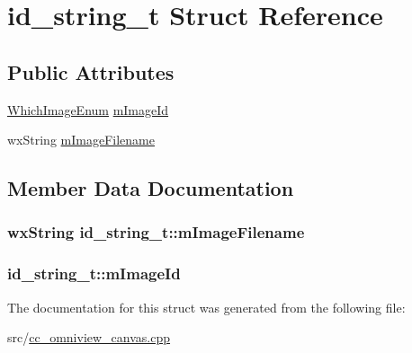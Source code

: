 \hypertarget{a00109}{\section{id\-\_\-string\-\_\-t Struct Reference}
\label{a00109}
}
\subsection*{Public Attributes}
\begin{DoxyCompactItemize}
\item 
\hyperlink{a00184_a7eb3720b4254c41f480c577182480c7b}{Which\-Image\-Enum} \hyperlink{a00109_a4f125fa4759bb32f510b4ac994c6ab51}{m\-Image\-Id}
\item 
wx\-String \hyperlink{a00109_a0eb71b151a5c13986c44b8eb81eb34db}{m\-Image\-Filename}
\end{DoxyCompactItemize}


\subsection{Member Data Documentation}
\hypertarget{a00109_a0eb71b151a5c13986c44b8eb81eb34db}{
\subsubsection[{m\-Image\-Filename}]{\setlength{\rightskip}{0pt plus 5cm}wx\-String id\-\_\-string\-\_\-t\-::m\-Image\-Filename}}\label{a00109_a0eb71b151a5c13986c44b8eb81eb34db}
\hypertarget{a00109_a4f125fa4759bb32f510b4ac994c6ab51}{
\subsubsection[{m\-Image\-Id}]{ id\-\_\-string\-\_\-t\-::m\-Image\-Id}}\label{a00109_a4f125fa4759bb32f510b4ac994c6ab51}


The documentation for this struct was generated from the following file\-:\begin{DoxyCompactItemize}
\item 
src/\hyperlink{a00184}{cc\-\_\-omniview\-\_\-canvas.\-cpp}\end{DoxyCompactItemize}
